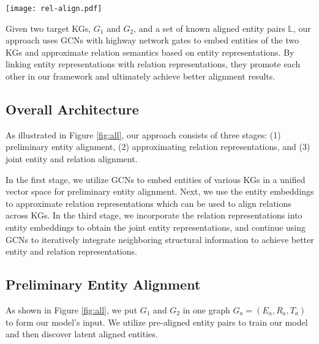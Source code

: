\documentclass[11pt,a4paper]{article}
\begin{document}
\begin{figure*}[t!]
	\centering
	\texttt{[image: rel-align.pdf]}
	\caption{Overall architecture of our model. The blue dotted lines denote the process of preliminary entity alignment and
		preliminary relation alignment using approximate relation representations, and the black solid lines denote the process of continuing using GCNs to iteratively learn better entity and relation representations.}\label{fig:all}
\end{figure*}


Given two target KGs, $G_1$ and $G_2$, and a set of known aligned entity pairs $\mathbb{L}$, our approach uses GCNs \cite{Kipf2016Semi}
with highway network \cite{Srivastava2015Highway} gates to embed entities of the two KGs and approximate relation semantics based on
entity representations. By linking entity representations with relation representations, they promote each other in our framework and ultimately achieve better alignment results.

\subsection{Overall Architecture}
\label{section:overall}

As illustrated in Figure \ref{fig:all}, our approach consists of three stages: (1) preliminary entity alignment, (2) approximating relation representations, and (3) joint entity and relation alignment.

In the first stage, we utilize GCNs to embed entities of various KGs in a unified vector space for preliminary entity alignment. Next, we use the entity embeddings to
approximate relation representations which can be used to align relations across KGs. In the third stage, we incorporate the relation representations into entity embeddings to obtain the joint entity representations, and continue using GCNs to iteratively integrate neighboring
structural information to achieve better entity and relation representations.


\subsection{Preliminary Entity Alignment}
\label{preEntAlign}
As shown in Figure \ref{fig:all}, we put $G_1$ and $G_2$ in one graph $G_a=(E_a, R_a, T_a)$ to form our model's input. We utilize pre-aligned
entity pairs to train our model and then discover latent aligned entities.
\end{document}
